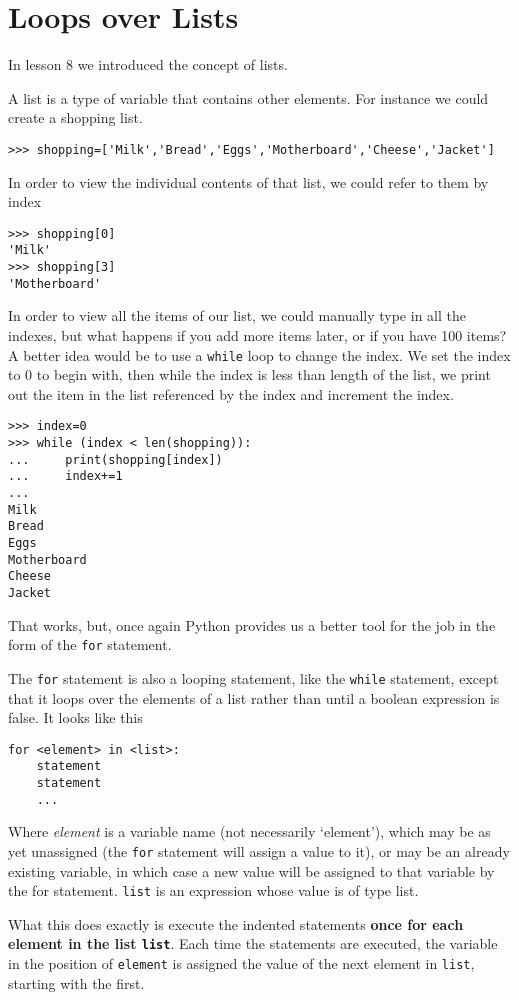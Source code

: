 \section{Loops over Lists}
In lesson 8 we introduced the concept of lists. 

A list is a type of variable that contains other elements. For instance we could create a shopping list. 
\begin{lstlisting}
>>> shopping=['Milk','Bread','Eggs','Motherboard','Cheese','Jacket']
\end{lstlisting}

In order to view the individual contents of that list, we could refer to them by index
\begin{lstlisting}
>>> shopping[0]
'Milk'
>>> shopping[3]
'Motherboard'
\end{lstlisting}

 In order to view all the items of our list, we could manually type in all the indexes, but what happens if you add more items later, or if you have 100 items? A better idea would be to use a \texttt{while} loop to change the index. We set the index to 0 to begin with, then while the index is less than length of the list, we print out the item in the list referenced by the index and increment the index.
\begin{lstlisting}
>>> index=0
>>> while (index < len(shopping)):
...     print(shopping[index])
...     index+=1
... 
Milk
Bread
Eggs
Motherboard
Cheese
Jacket
\end{lstlisting}

That works, but, once again Python provides us a better tool for the job in the form of the \texttt{for} statement.

The \texttt{for} statement is also a looping statement, like the \texttt{while} statement, except that it loops   over the elements of a list rather than until a boolean expression is false. It looks like this
\begin{lstlisting}
for <element> in <list>:
    statement
    statement
    ...
\end{lstlisting}

Where \textit{element} is a variable name (not necessarily `element'),   which may be as yet unassigned (the \texttt{for} statement will assign a value   to it), or may be an already existing variable, in which case a new value   will be assigned to that variable by the for statement. \texttt{list} is an   expression whose value is of type list.

What this does exactly is execute the indented statements \textbf{once for each element in the list \texttt{list}}. Each time the statements are executed, the variable in the position of \texttt{element}   is assigned the value of the next element in \texttt{list}, starting with the   first.

